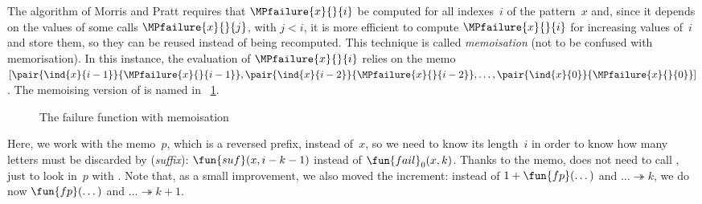 The algorithm of Morris and Pratt requires that \(\MPfailure{x}{}{i}\)
be computed for all indexes~\(i\) of the pattern~\(x\) and, since it
depends on the values of some calls \(\MPfailure{x}{}{j}\), with \(j <
i\), it is more efficient to compute \(\MPfailure{x}{}{i}\) for
increasing values of~\(i\) and store them, so they can be reused
instead of being recomputed. This technique is called
\emph{memoisation} (not to be confused with
memorisation). In this instance, the evaluation of
\(\MPfailure{x}{}{i}\) relies on the memo
\([\pair{\ind{x}{i-1}}{\MPfailure{x}{}{i-1}},
\pair{\ind{x}{i-2}}{\MPfailure{x}{}{i-2}}, \dots,
\pair{\ind{x}{0}}{\MPfailure{x}{}{0}}]\). The memoising version of
 is named  in
\fig~\ref{fig:fail}.
\begin{figure}[b]
\centering
\abovedisplayskip=0pt
\belowdisplayskip=0pt
\caption{The failure function with memoisation}
\label{fig:fail}
\end{figure}
Here, we work with the memo~\(p\), which is a reversed prefix, instead
of~\(x\), so we need to know its length~\(i\) in order to know how
many letters must be discarded by 
(\emph{suffix}): \(\fun{suf}(x,i-k-1)\) instead of
\(\fun{fail}_0(x,k)\). Thanks to the memo,  does not need to
call , just to look in~\(p\) with . Note that,
as a small improvement, we also moved the increment: instead of \(1 +
\fun{fp}(\dots)\) and \(\dots \twoheadrightarrow k\), we do now
\(\fun{fp}(\dots)\) and \(\dots \twoheadrightarrow k+1\).

